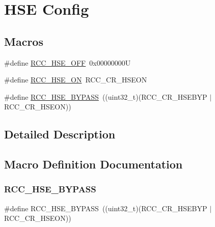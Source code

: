 \hypertarget{group___r_c_c___h_s_e___config}{}\section{H\+SE Config}
\label{group___r_c_c___h_s_e___config}
\subsection*{Macros}
\begin{DoxyCompactItemize}
\item 
\#define \hyperlink{group___r_c_c___h_s_e___config_ga1616626d23fbce440398578855df6f97}{R\+C\+C\+\_\+\+H\+S\+E\+\_\+\+O\+FF}~0x00000000U
\item 
\#define \hyperlink{group___r_c_c___h_s_e___config_gabc4f70a44776c557af20496b04d9a9db}{R\+C\+C\+\_\+\+H\+S\+E\+\_\+\+ON}~R\+C\+C\+\_\+\+C\+R\+\_\+\+H\+S\+E\+ON
\item 
\#define \hyperlink{group___r_c_c___h_s_e___config_ga5ca515db2d5c4d5bdb9ee3d154df2704}{R\+C\+C\+\_\+\+H\+S\+E\+\_\+\+B\+Y\+P\+A\+SS}~((uint32\+\_\+t)(R\+C\+C\+\_\+\+C\+R\+\_\+\+H\+S\+E\+B\+YP $\vert$ R\+C\+C\+\_\+\+C\+R\+\_\+\+H\+S\+E\+ON))
\end{DoxyCompactItemize}


\subsection{Detailed Description}


\subsection{Macro Definition Documentation}
\mbox{\label{group___r_c_c___h_s_e___config_ga5ca515db2d5c4d5bdb9ee3d154df2704}} 
\subsubsection{\texorpdfstring{R\+C\+C\+\_\+\+H\+S\+E\+\_\+\+B\+Y\+P\+A\+SS}{RCC\_HSE\_BYPASS}}
{\footnotesize\ttfamily \#define R\+C\+C\+\_\+\+H\+S\+E\+\_\+\+B\+Y\+P\+A\+SS~((uint32\+\_\+t)(R\+C\+C\+\_\+\+C\+R\+\_\+\+H\+S\+E\+B\+YP $\vert$ R\+C\+C\+\_\+\+C\+R\+\_\+\+H\+S\+E\+ON))}

